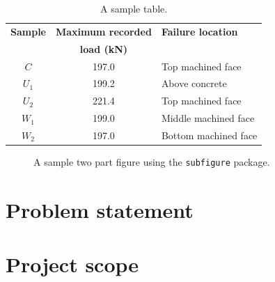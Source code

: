 \begin{table}[htbp]
  \centering
  \begin{tabular}{ccl}
    \hline
    \textbf{Sample} & \textbf{Maximum recorded} &  \textbf{Failure location} \\
    \textbf{}		& \textbf{load (kN)}		&  \textbf{} \\
    \hline
    $C$    &  197.0  &  Top machined face     \\
    $U_1$  &  199.2  &  Above concrete        \\
    $U_2$  &  221.4  &  Top machined face     \\
    $W_1$  &  199.0  &  Middle machined face  \\
    $W_2$  &  197.0  &  Bottom machined face  \\
    \hline
    \end{tabular}
  \caption{A sample table.}
  \label{tab:demo}
\end{table}

\begin{figure}[htbp]
\centering
 \quad\quad
   \caption{A sample two part figure using the {\tt subfigure} package.}
  \label{fig:demo}
\end{figure}


\section{Problem statement}

\section{Project scope}
